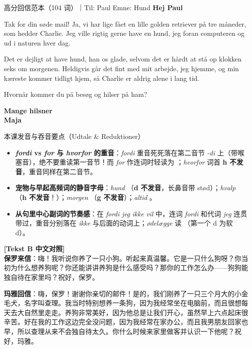 \begin{emailbox}{高分回信范本（104 词）｜Til: Paul \quad Emne: Hund}
\textbf{Hej Paul}

Tak for din søde mail! Ja, vi har lige fået en lille golden retriever på tre måneder, som hedder Charlie. Jeg ville rigtig gerne have en hund,  jeg  foran computeren og  ud i naturen hver dag.

Det er dejligt at have hund,  han  os glade, selvom det er hårdt at stå op klokken seks om morgenen. Heldigvis går det fint med mit arbejde,  jeg  hjemme, og min kæreste kommer tidligt hjem, så Charlie er aldrig alene i lang tid.

Hvornår kommer du på besøg og hilser på ham?

\textbf{Mange hilsner}\\
\textbf{Maja}
\end{emailbox}

\begin{tipbox}{本课发音与吞音要点（Udtale \& Reduktioner）}
\begin{itemize}
  \item \textbf{\textit{fordi} vs \textit{for} 与 \textit{hvorfor} 的重音}：\textit{fordi}  重音死死落在第二音节 \textit{-di} 上（带喉塞音），绝不要重读第一音节！而 \textit{for} 作连词时轻读为 ；\textit{hvorfor}  词首 \textbf{h 不发音}，重音同样在第二音节。
  \item \textbf{宠物与早起高频词的静音字母}：\textit{hund} （\textbf{d 不发音}，长鼻音带 stød）；\textit{hvalp} （\textbf{h 不发音}！）；\textit{morgen} （\textbf{g 不发音}）；\textit{altid} 。
  \item \textbf{从句里中心副词的节奏感}：在 \textit{fordi jeg ikke vil}  中，连词 \textit{fordi} 和代词 \textit{jeg} 连贯带过，重音分别落在 \textit{ikke} 与后面的动词上；\textit{ødelægge} 读 （第一个 d 为软 d）。
\end{itemize}
\end{tipbox}

\begin{transbox}
\small
\textbf{\color{NCDTeal}[Tekst B 中文对照]}\\
\textbf{保罗来信}：嗨！我听说你养了一只小狗。听起来真温馨。它是一只什么狗呀？你当初为什么想养狗呢？你还能讲讲养狗是什么感受吗？那你的工作怎么办——狗狗能独自待在家里吗？祝好，保罗。

\textbf{玛雅回信}：嗨，保罗！谢谢你亲切的邮件！是的，我们刚养了一只三个月大的小金毛犬，名字叫查理。我当时特别想养一条狗，因为我经常坐在电脑前，而且很想每天去大自然里走走。养狗非常美好，因为他总是让我们开心，虽然早上六点起床很辛苦。好在我的工作这边完全没问题，因为我经常在家办公，而且我男朋友回家也早，所以查理从来不会独自待太久。你什么时候来家里做客并认识一下他呢？祝好，玛雅。
\end{transbox}

